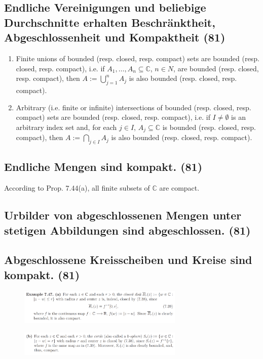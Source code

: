 \subsection{Endliche Vereinigungen und beliebige Durchschnitte erhalten Beschränktheit, Abgeschlossenheit und Kompaktheit (81)}
\begin{enumerate}[label=(\alph*)]
\item Finite unions of bounded (resp. closed, resp. compact) sets are bounded (resp. closed, resp. compact), i.e. if $A_1, \dots , A_n \subseteq \mathbb{C}$, $n \in {N}$, are bounded (resp. closed, resp. compact), then $A := \bigcup _ { j = 1} ^ { n } A _ { j }$ is also bounded (resp. closed, resp. compact).

\item Arbitrary (i.e. finite or infinite) intersections of bounded (resp. closed, resp. compact) sets are bounded (resp. closed, resp. compact), i.e. if $I \neq \emptyset$ is an arbitrary index set and, for each $j \in I$, $A_j \subseteq \mathbb{C}$ is bounded (resp. closed, resp. compact), then $A := \bigcap _{j\in I}A_j$ is also bounded (resp. closed, resp. compact).
\end{enumerate}

\subsection{Endliche Mengen sind kompakt. (81)}
According to Prop. 7.44(a), all finite subsets of $\mathbb{C}$ are compact.

\subsection{Urbilder von abgeschlossenen Mengen unter stetigen Abbildungen sind abgeschlossen. (81)}

\subsection{Abgeschlossene Kreisscheiben und Kreise sind kompakt. (81)}

\begin{figure}[H] \centering
\includegraphics[width=0.7\textwidth]{media/7-14.png}
\end{figure}
\begin{figure}[H] \centering
\includegraphics[width=0.7\textwidth]{media/7-14-2.png}
\end{figure}

